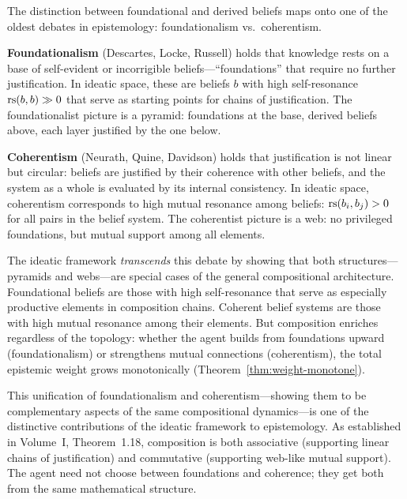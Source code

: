 \begin{remark}
The distinction between foundational and derived beliefs maps onto one of the
oldest debates in epistemology: foundationalism vs.\ coherentism.

\textbf{Foundationalism} (Descartes, Locke, Russell) holds that knowledge rests
on a base of self-evident or incorrigible beliefs---``foundations'' that require
no further justification. In ideatic space, these are beliefs $b$ with high
self-resonance $\mathrm{rs}(b, b) \gg 0$ that serve as starting points for chains of
justification. The foundationalist picture is a pyramid: foundations at the base,
derived beliefs above, each layer justified by the one below.

\textbf{Coherentism} (Neurath, Quine, Davidson) holds that justification is
not linear but circular: beliefs are justified by their coherence with other
beliefs, and the system as a whole is evaluated by its internal consistency.
In ideatic space, coherentism corresponds to high mutual resonance among beliefs:
$\mathrm{rs}(b_i, b_j) > 0$ for all pairs in the belief system. The coherentist picture
is a web: no privileged foundations, but mutual support among all elements.

The ideatic framework \emph{transcends} this debate by showing that both
structures---pyramids and webs---are special cases of the general compositional
architecture. Foundational beliefs are those with high self-resonance that serve
as especially productive elements in composition chains. Coherent belief systems
are those with high mutual resonance among their elements. But composition
enriches regardless of the topology: whether the agent builds from foundations
upward (foundationalism) or strengthens mutual connections (coherentism), the
total epistemic weight grows monotonically (Theorem~\ref{thm:weight-monotone}).

This unification of foundationalism and coherentism---showing them to be
complementary aspects of the same compositional dynamics---is one of the
distinctive contributions of the ideatic framework to epistemology. As
established in Volume~I, Theorem~1.18, composition is both associative
(supporting linear chains of justification) and commutative (supporting
web-like mutual support). The agent need not choose between foundations and
coherence; they get both from the same mathematical structure.
\end{remark}

